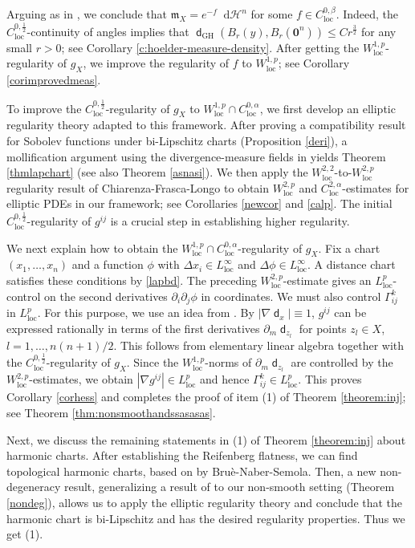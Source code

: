 \documentclass[11pt,reqno]{amsart}
\theoremstyle{definition}
\numberwithin{equation}{section}
\newcommand{\di}{\mathop{}\!\mathrm{d}}
\newcommand{\meas}{\mathfrak{m}}
\DeclareMathOperator{\dist}{\mathsf{d}}
\DeclareMathOperator{\loc}{loc}
\newcommand{\haus}{\mathscr{H}}
\begin{document}
Arguing as in \cite{Cheeger-Colding-III}, we conclude that $\meas_X=e^{-f}\di \haus^n$ for some $f\in C^{0,\beta}_{\loc} $. Indeed, the $C^{0,\frac{1}{2}}_{\loc}$-continuity of angles implies that $
\dist_{\mathrm{GH}}(B_r(y), B_r(\mathbf{0}^n))\le Cr^{\frac{3}{2}}
$ for any small $r>0$; see Corollary \ref{c:hoelder-measure-density}.
  After getting the $W^{1,p}_{\loc}$-regularity of $g_X$, we improve the regularity of $f$ to $W^{1,p}_{\loc}$; see Corollary \ref{corimprovedmeas}.

To improve the $C^{0,\frac{1}{2}}_{\loc}$-regularity of $g_X$ to $W^{1,p}_{\loc}\cap C^{0,\alpha}_{\loc}$, we first develop an elliptic regularity theory adapted to this framework. After proving a compatibility result for Sobolev functions under bi-Lipschitz charts (Proposition \ref{deri}),   a mollification argument using the divergence-measure fields in \cite{BCM} yields Theorem \ref{thmlapchart} (see also Theorem \ref{asnasi}). We then apply the $W^{2,2}_{\loc}$-to-$W^{2,p}_{\loc}$ regularity result of Chiarenza-Frasca-Longo \cite{CFL} to obtain $W^{2,p}_{\loc}$ and $C^{2,\alpha}_{\loc}$-estimates for elliptic PDEs in our framework; see Corollaries \ref{newcor} and \ref{calp}. The initial $C^{0,\frac{1}{2}}_{\loc}$-regularity of $g^{ij}$ is a crucial step in establishing higher regularity.
 
We next explain how to obtain the $W^{1,p}_{\loc}\cap C^{0,\alpha}_{\loc}$-regularity of $g_X$. Fix a chart $(x_1, \ldots, x_n)$ and a function $\phi$ with $\Delta x_i\in L^{\infty}_{\loc}$ and $\Delta \phi \in L^{\infty}_{\loc}$. A distance chart satisfies these conditions by \eqref{lapbd}.
The preceding $W^{2,p}_{\loc}$-estimate gives an $L^p_{\loc}$-control on the second derivatives $\partial_i\partial_j\phi$  in coordinates.
We must also control $\Gamma_{ij}^k$ in $L^p_{\loc}$. For this purpose, we use an idea from \cite{AC}.  By $|\nabla \dist_x| \equiv 1$, $g^{ij}$ can be expressed rationally in terms of the first derivatives $\partial_m \dist_{z_l}$ for points $z_l \in X$, $ l=1,\ldots, n(n+1)/2$. This follows from elementary linear algebra together with the $C^{0,\frac{1}{2}}_{\loc}$-regularity of $g_X$. Since the $W^{1,p}_{\loc}$-norms of $\partial_m \dist_{z_l}$ are   controlled by the $W^{2,p}_{\loc}$-estimates, we obtain $|\nabla g^{ij}| \in L^p_{\loc}$ and hence $\Gamma_{ij}^k \in L^p_{\loc}$. This proves Corollary \ref{corhess} and  completes the proof of item (1) of Theorem \ref{theorem:inj}; see Theorem \ref{thm:nonsmoothandssasasas}.

Next, we discuss 
the remaining statements in (1) of Theorem \ref{theorem:inj} about harmonic charts. After establishing the Reifenberg flatness,
we can find topological harmonic charts, based on \cite{BNS} by Bru\`e-Naber-Semola. Then, a new non-degeneracy result, generalizing a result of \cite{CJN} to our non-smooth setting (Theorem \ref{nondeg}), allows us to apply the  elliptic regularity theory  and conclude that the harmonic chart is  bi-Lipschitz and has the desired regularity properties. Thus we get (1).
\end{document}
